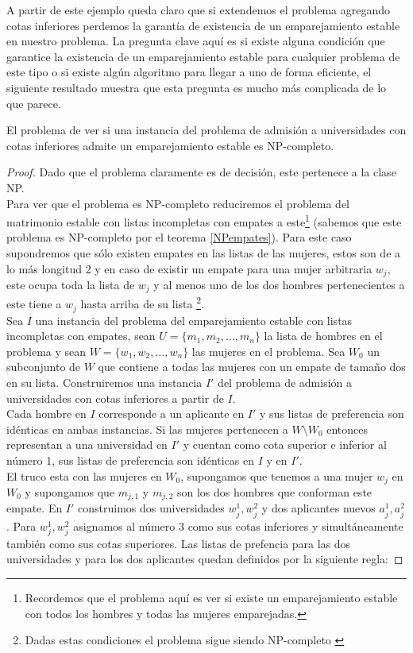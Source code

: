 A partir de este ejemplo queda claro que si extendemos el problema agregando cotas inferiores perdemos la garantía de existencia de un emparejamiento estable en nuestro problema. La pregunta clave aquí es si existe alguna condición que garantice la existencia de un emparejamiento estable para cualquier problema de este tipo o si existe algún algoritmo para llegar a uno de forma eficiente, el siguiente resultado muestra que esta pregunta es mucho más complicada de lo que parece. 

\begin{teo} \cite{Todo}
\label{np1}
El problema de ver si una instancia del problema de admisión a universidades con cotas inferiores admite un emparejamiento estable es NP-completo. 
\end{teo}

\begin{proof}
Dado que el problema claramente es de decisión, este pertenece a la clase NP. \\ Para ver que el problema es NP-completo reduciremos el problema del matrimonio estable con listas incompletas con empates a este\footnote{Recordemos que el problema aquí es ver si existe un emparejamiento estable con todos los hombres y todas las mujeres emparejadas.} (sabemos que este problema es NP-completo por el teorema \ref{NPempates}). Para este caso supondremos que sólo existen empates en las listas de las mujeres, estos son de a lo más longitud 2 y en caso de existir un empate para una mujer arbitraria $w_j$, este ocupa toda la lista de $w_j$ y al menos uno de los dos hombres pertenecientes a este tiene a $w_j$ hasta arriba de su lista \footnote{Dadas estas condiciones el problema sigue siendo NP-completo \cite{empates}}. \\
Sea $I$ una instancia del problema del emparejamiento estable con listas incompletas con empates, sean $U=\{m_1,m_2,\dots,m_n\}$ la lista de hombres en el problema y sean $W=\{w_1,w_2,\dots,w_n\}$ las mujeres en el problema. Sea $W_0$ un subconjunto de $W$ que contiene a todas las mujeres con un empate de tamaño dos en su lista. Construiremos una instancia $I'$ del problema de admisión a universidades con cotas inferiores a partir de $I$. \\
Cada hombre en $I$ corresponde a un aplicante en $I'$ y sus listas de preferencia son idénticas en ambas instancias. Si las mujeres pertenecen a $W \setminus W_0$ entonces representan a una universidad en $I'$ y cuentan como cota superior e inferior al número 1, sus listas de preferencia son idénticas en $I$ y en $I'$.\\ El truco esta con las mujeres en $W_0$, supongamos que tenemos a una mujer $w_j$ en $W_0$ y supongamos que $m_{j,1} $ y $m_{j,2}$ son los dos hombres que conforman este empate. En $I'$ construimos dos universidades $w_j^{1}, w_{j}^2$ y dos aplicantes nuevos $a_j^1, a_j^2$. Para $w_j^{1}, w_{j}^2$ asignamos al número 3 como sus cotas inferiores y simultáneamente también como sus cotas superiores. Las listas de prefencia para las dos universidades y para los dos aplicantes quedan definidos por la siguiente regla:

\end{proof}
